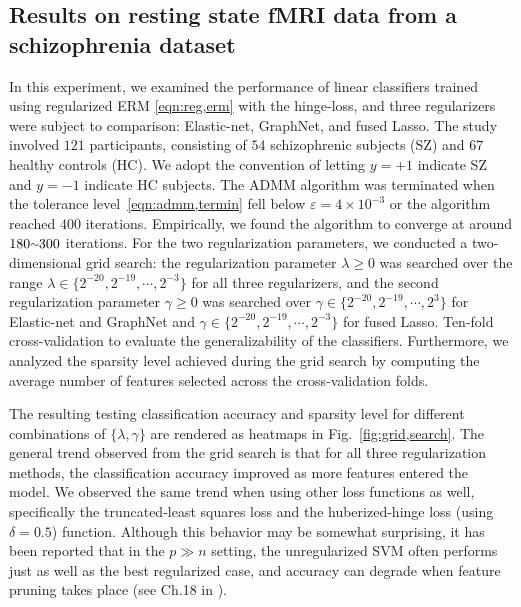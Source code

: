 \subsection{Results on resting state fMRI data from a schizophrenia dataset}
\label{subsec:result,real,data}
In this experiment, we examined the performance of linear classifiers trained using regularized ERM \eqref{eqn:reg,erm} with the hinge-loss, and three regularizers were subject to comparison: Elastic-net, GraphNet, and fused Lasso.  
The study involved $121$ participants, consisting of $54$ schizophrenic subjects (SZ) and $67$ healthy controls (HC).
We adopt the convention of letting $y=+1$ indicate SZ and $y=-1$ indicate HC subjects.
The ADMM algorithm was terminated when the tolerance level~\eqref{eqn:admm,termin} fell below $\varepsilon=4\times 10^{-3}$ or the algorithm reached $400$ iterations.
Empirically, we found the algorithm to converge at around $180\mytilde 300$ iterations.
For the two regularization parameters, we conducted a two-dimensional grid search: the \ellone regularization parameter $\lambda\geq 0$ was searched over the range $\lambda\in\{2^{-20},2^{-19},\cdots,2^{-3}\}$ for all three regularizers, and the second regularization parameter $\gamma\geq 0$ was searched over $\gamma\in\{2^{-20},2^{-19},\cdots,2^{3}\}$ for Elastic-net and GraphNet and $\gamma\in\{2^{-20},2^{-19},\cdots,2^{-3}\}$ for fused Lasso.
Ten-fold cross-validation to evaluate the generalizability of the classifiers.
Furthermore, we analyzed the sparsity level achieved during the grid search by computing the average number of features selected across the cross-validation folds.

The resulting testing classification accuracy and sparsity level for different combinations of $\{\lambda,\gamma\}$ are rendered as heatmaps in Fig.~\ref{fig:grid,search}.
The general trend observed from the grid search is that for all three regularization methods, the classification accuracy improved as more features entered the model.
We observed the same trend when using other loss functions as well, specifically the truncated-least squares loss and the huberized-hinge loss (using $\delta=0.5$) function.
Although this behavior may be somewhat surprising, it has been reported that in the $p\gg n$ setting, the unregularized SVM often performs just as well as the best regularized case, and accuracy can degrade when feature pruning takes place (see Ch.18 in \cite{Hastie:2009:book}).

